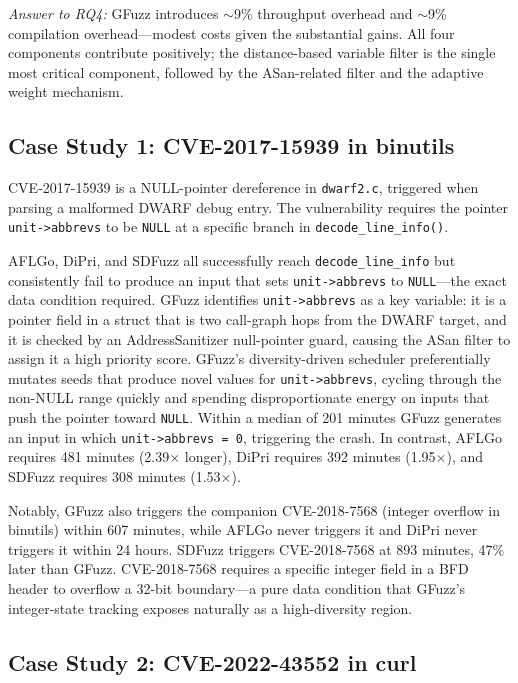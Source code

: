 \documentclass[preprint,12pt,3p]{elsarticle}
\begin{document}
\textit{Answer to RQ4:} GFuzz introduces $\sim$9\% throughput overhead and
$\sim$9\% compilation overhead---modest costs given the substantial gains.
All four components contribute positively; the distance-based variable filter
is the single most critical component, followed by the ASan-related filter
and the adaptive weight mechanism.

\subsection{Case Study 1: CVE-2017-15939 in binutils}

CVE-2017-15939 is a NULL-pointer dereference in \texttt{dwarf2.c}, triggered
when parsing a malformed DWARF debug entry. The vulnerability requires the
pointer \texttt{unit->abbrevs} to be \texttt{NULL} at a specific branch in
\texttt{decode\_line\_info()}.

AFLGo, DiPri, and SDFuzz all successfully reach \texttt{decode\_line\_info}
but consistently fail to produce an input that sets \texttt{unit->abbrevs} to
\texttt{NULL}---the exact data condition required.  GFuzz identifies
\texttt{unit->abbrevs} as a key variable: it is a pointer field in a
struct that is two call-graph hops from the DWARF target, and it is checked
by an AddressSanitizer null-pointer guard, causing the ASan filter to assign
it a high priority score.  GFuzz's diversity-driven scheduler preferentially
mutates seeds that produce novel values for \texttt{unit->abbrevs}, cycling
through the non-NULL range quickly and spending disproportionate energy on
inputs that push the pointer toward \texttt{NULL}.  Within a median of 201
minutes GFuzz generates an input in which \texttt{unit->abbrevs~= 0},
triggering the crash.  In contrast, AFLGo requires 481 minutes (2.39$\times$
longer), DiPri requires 392 minutes (1.95$\times$), and SDFuzz requires
308 minutes (1.53$\times$).

Notably, GFuzz also triggers the companion CVE-2018-7568 (integer overflow
in binutils) within 607 minutes, while AFLGo never triggers it and DiPri
never triggers it within 24 hours.  SDFuzz triggers CVE-2018-7568 at 893
minutes, 47\% later than GFuzz.  CVE-2018-7568 requires a specific integer
field in a BFD header to overflow a 32-bit boundary---a pure data condition
that GFuzz's integer-state tracking exposes naturally as a high-diversity
region.

\subsection{Case Study 2: CVE-2022-43552 in curl}
\end{document}

